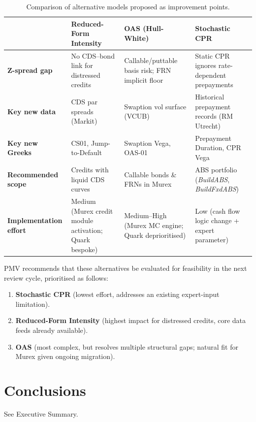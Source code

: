 \documentclass[reviewdoc]{pmv_report}  %
\begin{document}
\begin{table}[htb!]
\footnotesize
\centering
\begin{tabular}{p{3.2cm}|p{3.5cm}|p{3.5cm}|p{3.5cm}}
  \toprule[0.05cm]
  & \textbf{Reduced-Form Intensity} & \textbf{OAS (Hull-White)} & \textbf{Stochastic CPR} \\
  \hline\hline
  \textbf{Z-spread gap} & No CDS--bond link for distressed credits & Callable/puttable basis risk; FRN implicit floor & Static CPR ignores rate-dependent prepayments \\ \hline
  \textbf{Key new data} & CDS par spreads (Markit) & Swaption vol surface (VCUB) & Historical prepayment records (RM Utrecht) \\ \hline
  \textbf{Key new Greeks} & CS01, Jump-to-Default & Swaption Vega, OAS-01 & Prepayment Duration, CPR Vega \\ \hline
  \textbf{Recommended scope} & Credits with liquid CDS curves & Callable bonds \& FRNs in Murex & ABS portfolio (\textit{BuildABS}, \textit{BuildFxdABS}) \\ \hline
  \textbf{Implementation effort} & Medium (Murex credit module activation; Quark bespoke) & Medium--High (Murex MC engine; Quark deprioritised) & Low (cash flow logic change + expert parameter) \\
  \bottomrule[0.05cm]
\end{tabular}
\caption{Comparison of alternative models proposed as improvement points.}
\label{table:AlternativeSummary}
\end{table}

PMV recommends that these alternatives be evaluated for feasibility in the next review cycle, prioritised as follows:
\begin{enumerate}
  \item \textbf{Stochastic CPR} (lowest effort, addresses an existing expert-input limitation).
  \item \textbf{Reduced-Form Intensity} (highest impact for distressed credits, core data feeds already available).
  \item \textbf{OAS} (most complex, but resolves multiple structural gaps; natural fit for Murex given ongoing migration).
\end{enumerate}


\section{Conclusions}\label{sec:Conclusions}
See Executive Summary.
\end{document}
